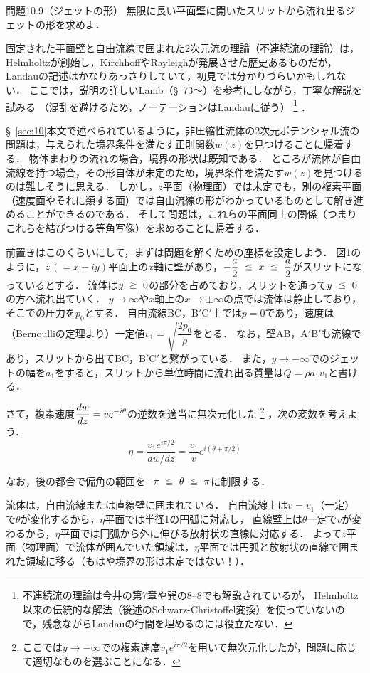 \begin{mondai}{}{問題10.9（ジェットの形）}
無限に長い平面壁に開いたスリットから流れ出るジェットの形を求めよ．
\end{mondai}
\begin{kaitou}
固定された平面壁と自由流線で囲まれた2次元流の理論（不連続流の理論）は，
Helmholtzが創始し，KirchhoffやRayleighが発展させた歴史あるものだが，Landauの記述はかなりあっさりしていて，初見では分かりづらいかもしれない．
ここでは，説明の詳しいLamb（\S~73〜）を参考にしながら，丁寧な解説を試みる
（混乱を避けるため，ノーテーションはLandauに従う）
\footnote{
不連続流の理論は今井の第7章や巽の8--8でも解説されているが，
Helmholtz以来の伝統的な解法（後述のSchwarz-Christoffel変換）を使っていないので，残念ながらLandauの行間を埋めるのには役立たない．
}
．

\S~\ref{sec:10}本文で述べられているように，非圧縮性流体の2次元ポテンシャル流の問題は，与えられた境界条件を満たす正則関数$w(z)$を見つけることに帰着する．
物体まわりの流れの場合，境界の形状は既知である．
ところが流体が自由流線を持つ場合，その形自体が未定のため，境界条件を満たす$w(z)$を見つけるのは難しそうに思える．
しかし，$z$平面（物理面）では未定でも，別の複素平面（速度面やそれに類する面）では自由流線の形がわかっているものとして解き進めることができるのである．
そして問題は，これらの平面同士の関係（つまりこれらを結びつける等角写像）を求めることに帰着する．



前置きはこのくらいにして，まずは問題を解くための座標を設定しよう．
図1のように，$z\,(=x+iy)$平面上の$x$軸に壁があり，$-\dfrac{a}{2} \ika  x \ika \dfrac{a}{2}$がスリットになっているとする．
流体は$y \ijou 0$の部分を占めており，スリットを通って$y \ika 0$の方へ流れ出ていく．
$y \to \infty$や$x$軸上の$x\to\pm\infty$の点では流体は静止しており，そこでの圧力を$p_0$とする．
自由流線BC，$\mathrm{B'C'}$上では$p=0$であり，速度は（Bernoulliの定理より）一定値$v_1 = \sqrt{\dfrac{2p_0}{\rho}}$をとる．
なお，壁AB，$\mathrm{A'B'}$も流線であり，スリットから出てBC，$\mathrm{B'C'}$と繋がっている．
また，$y\to-\infty$でのジェットの幅を$a_1$をすると，スリットから単位時間に流れ出る質量は$Q=\rho a_1v_1$と書ける．


さて，複素速度$\ddv{w}{z}=v e^{-i\theta}$の逆数を適当に無次元化した
\footnote{ここでは$y\to-\infty$での複素速度$v_1 e^{i\pi/2}$を用いて無次元化したが，問題に応じて適切なものを選ぶことになる．}
，次の変数を考えよう．
\[
    \eta = \frac{v_1 e^{i\pi/2}}{dw/dz} = \frac{v_1}{v} e^{i(\theta+\pi/2)}
\]
\begin{details}
なお，後の都合で偏角の範囲を$-\pi \ika \theta \ika \pi$に制限する．   
\end{details}
\noindent
流体は，自由流線または直線壁に囲まれている．
自由流線上は$v=v_1$（一定）で$\theta$が変化するから，$\eta$平面では半径1の円弧に対応し，
直線壁上は$\theta$一定で$v$が変わるから，$\eta$平面では円弧から外に伸びる放射状の直線に対応する．
よって$z$平面（物理面）で流体が囲んでいた領域は，$\eta$平面では円弧と放射状の直線で囲まれた領域に移る（もはや境界の形は未定ではない！）．


\end{kaitou}
